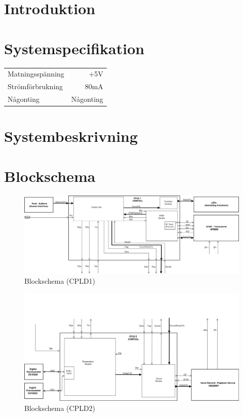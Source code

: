 \documentclass[a4paper,11pt]{article}
\begin{document}
\section{Introduktion}

\section{Systemspecifikation}

	\begin{tabular}{ l r}
	   Matningsspänning & +5V\\
	   Strömförbrukning & ~80mA\\
	   Någonting & Någonting\\
	\end{tabular}

\section{Systembeskrivning}

\section{Blockschema}

	\begin{figure}[h!]
	  \centering
	      \includegraphics[scale=0.48, angle=90]{BlockDiagramCPLD1.png}
	  	\caption{Blockschema (CPLD1)}
	\end{figure}

	\begin{figure}[h!]
	  \centering
	      \includegraphics[scale=0.48, angle=90]{BlockDiagramCPLD2.png}
	  	\caption{Blockschema (CPLD2)}
	\end{figure}
\end{document}
